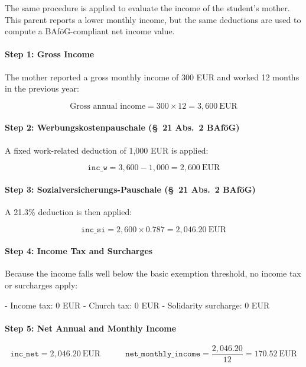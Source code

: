 The same procedure is applied to evaluate the income of the student’s mother. This parent reports a lower monthly income, but the same deductions are used to compute a BAföG-compliant net income value.

\paragraph{Step 1: Gross Income}

The mother reported a gross monthly income of 300 EUR and worked 12 months in the previous year:

\[
\text{Gross annual income} = 300 \times 12 = 3{,}600~\text{EUR}
\]

\paragraph{Step 2: Werbungskostenpauschale (§~21 Abs.~2 BAföG)}

A fixed work-related deduction of 1,000 EUR is applied:

\[
\texttt{inc\_w} = 3{,}600 - 1{,}000 = 2{,}600~\text{EUR}
\]

\paragraph{Step 3: Sozialversicherungs-Pauschale (§~21 Abs.~2 BAföG)}

A 21.3\% deduction is then applied:

\[
\texttt{inc\_si} = 2{,}600 \times 0.787 = 2{,}046.20~\text{EUR}
\]

\paragraph{Step 4: Income Tax and Surcharges}

Because the income falls well below the basic exemption threshold, no income tax or surcharges apply:

- Income tax: 0 EUR
- Church tax: 0 EUR
- Solidarity surcharge: 0 EUR

\paragraph{Step 5: Net Annual and Monthly Income}

\[
\texttt{inc\_net} = 2{,}046.20~\text{EUR}
\qquad\quad
\texttt{net\_monthly\_income} = \frac{2{,}046.20}{12} = 170.52~\text{EUR}
\]

